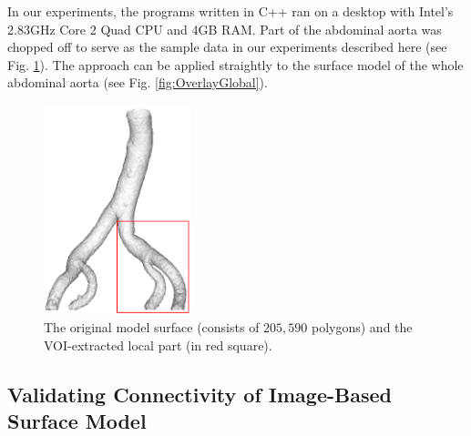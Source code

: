 In our experiments, the programs written in C++ ran on a desktop with Intel's 2.83GHz Core 2 Quad CPU and 4GB RAM.
Part of the abdominal aorta was chopped off to serve as the sample data in our experiments described here (see Fig. \ref{fig:VOI}). %
The approach can be applied straightly to the surface model of the whole abdominal aorta (see Fig. \ref{fig:OverlayGlobal}). %
\begin{figure}[t]
\centering
\includegraphics[height=2.4in]{Figures/VOI.png}
\caption{The original model surface (consists of $205,590$ polygons) and the VOI-extracted local part (in red square).}
\label{fig:VOI}
\end{figure}


\subsection{Validating Connectivity of Image-Based Surface Model}

